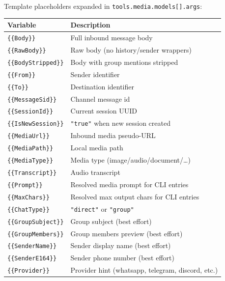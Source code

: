 Template placeholders expanded in \texttt{tools.media.models[].args}:


\begin{table}[h]
\centering
\small
\begin{tabular}{|l|l|}
\hline
Variable & Description \\
\hline
\texttt{\{\{Body\}\}} & Full inbound message body \\
\hline
\texttt{\{\{RawBody\}\}} & Raw body (no history/sender wrappers) \\
\hline
\texttt{\{\{BodyStripped\}\}} & Body with group mentions stripped \\
\hline
\texttt{\{\{From\}\}} & Sender identifier \\
\hline
\texttt{\{\{To\}\}} & Destination identifier \\
\hline
\texttt{\{\{MessageSid\}\}} & Channel message id \\
\hline
\texttt{\{\{SessionId\}\}} & Current session UUID \\
\hline
\texttt{\{\{IsNewSession\}\}} & \texttt{"true"} when new session created \\
\hline
\texttt{\{\{MediaUrl\}\}} & Inbound media pseudo-URL \\
\hline
\texttt{\{\{MediaPath\}\}} & Local media path \\
\hline
\texttt{\{\{MediaType\}\}} & Media type (image/audio/document/…) \\
\hline
\texttt{\{\{Transcript\}\}} & Audio transcript \\
\hline
\texttt{\{\{Prompt\}\}} & Resolved media prompt for CLI entries \\
\hline
\texttt{\{\{MaxChars\}\}} & Resolved max output chars for CLI entries \\
\hline
\texttt{\{\{ChatType\}\}} & \texttt{"direct"} or \texttt{"group"} \\
\hline
\texttt{\{\{GroupSubject\}\}} & Group subject (best effort) \\
\hline
\texttt{\{\{GroupMembers\}\}} & Group members preview (best effort) \\
\hline
\texttt{\{\{SenderName\}\}} & Sender display name (best effort) \\
\hline
\texttt{\{\{SenderE164\}\}} & Sender phone number (best effort) \\
\hline
\texttt{\{\{Provider\}\}} & Provider hint (whatsapp, telegram, discord, etc.) \\
\hline
\end{tabular}
\end{table}



